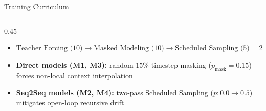 \documentclass[aspectratio=169,10pt]{beamer}
\begin{document}
\begin{frame}{Training Curriculum}
    \begin{columns}[T]
        \begin{column}{0.45\textwidth}
            \begin{itemize}\setlength{\itemsep}{6pt}
                \item \fontsize{9}{12}\selectfont $\text{Teacher Forcing (10)} \rightarrow \text{Masked Modeling (10)} \rightarrow \text{Scheduled Sampling (5)} = 25\text{ epochs}$
                \item \textbf{Direct models (M1, M3):} random $15\%$ timestep masking ($p_{\text{mask}}=0.15$) forces non-local context interpolation
                \item \textbf{Seq2Seq models (M2, M4):} two-pass Scheduled Sampling ($p: 0.0 \rightarrow 0.5$) mitigates open-loop recursive drift
            \end{itemize}


\end{column}
\end{columns}
\end{frame}
\end{document}
